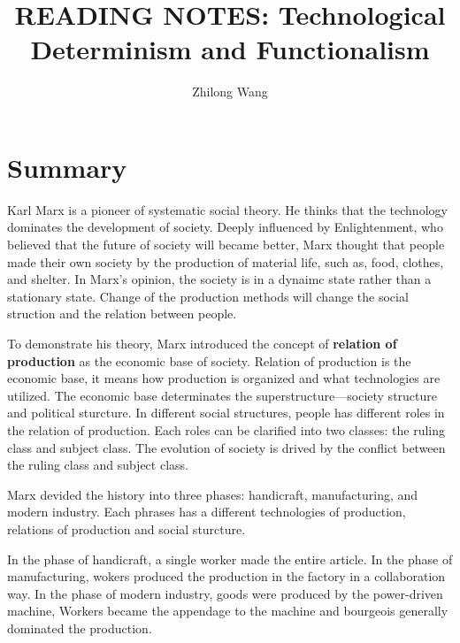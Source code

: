 \documentclass[letterpaper,12pt]{article}
\begin{document}
 
 
\title{READING NOTES: Technological Determinism and Functionalism}
\author{Zhilong Wang}

\maketitle
\section{Summary}
Karl Marx is a pioneer of systematic social theory. 
He thinks that the technology dominates the development of society.
Deeply influenced by Enlightenment, who believed that the future of society 
will became better, Marx thought that people made their own society by the production 
of material life, such as, food, clothes, and shelter\cite{textbook}.
In Marx's opinion, the society is in a dynaimc state rather than a stationary state.
Change of the production methods will change the social struction and the relation between people.

To demonstrate his theory, Marx introduced the concept of \textbf{relation of production}
as the economic base of society. 
Relation of production is the economic base, it means how production is organized and what technologies are utilized.
The economic base determinates the superstructure---society structure and political sturcture.
In different social structures, people has different roles in the relation of production.
Each roles can be clarified into two classes: the ruling class and subject class.
The evolution of society is drived by the conflict between the ruling class and subject class.

Marx devided the history into three phases: handicraft, manufacturing, and modern industry.
Each phrases has a different technologies of production, relations of production and social sturcture.

In the phase of handicraft, a single worker made the entire article\cite{textbook}.
In the phase of manufacturing, wokers produced the production in the factory in a collaboration way.
In the phase of modern industry, goods were produced by the power-driven machine, 
Workers became the appendage to the machine and bourgeois generally dominated the production.

\newcommand{\tabincell}[2]{\begin{tabular}{@{}#1@{}}#2\end{tabular}}  
\end{document}
